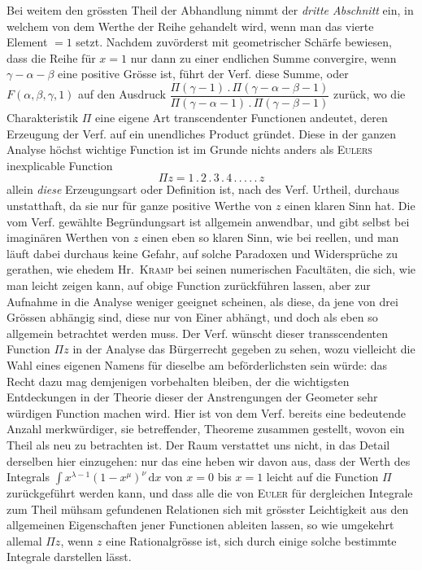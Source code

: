 Bei weitem den grössten Theil der Abhandlung nimmt der \textit{dritte Abschnitt} ein, in welchem von dem Werthe der Reihe gehandelt wird, wenn man das vierte Element $=1$ setzt. Nachdem zuvörderst mit geometrischer Schärfe bewiesen, dass die Reihe für $x=1$ nur dann zu einer endlichen Summe convergire, wenn $\gamma-\alpha-\beta$ eine positive Grösse ist, führt der Verf. diese Summe, oder $F(\alpha,\beta,\gamma,1)$ auf den Ausdruck $\dfrac{\Pi(\gamma-1)\,.\,\Pi(\gamma-\alpha-\beta-1)}{\Pi(\gamma-\alpha-1)\,.\,\Pi(\gamma-\beta-1)}$ zurück, wo die Charakteristik $\Pi$ eine eigene Art transcendenter Functionen andeutet, deren Erzeugung der Verf. auf ein unendliches Product gründet. Diese in der ganzen Analyse höchst wichtige Function ist im Grunde nichts anders als \textsc{Eulers} inexplicable Function
\[
\Pi z=1\,.\,2\,.\,3\,.\,4\,.\,.\,.\,.\,.\,z
\]
allein \textit{diese} Erzeugungsart oder Definition ist, nach des Verf. Urtheil, durchaus unstatthaft, da sie nur für ganze positive Werthe von $z$ einen klaren Sinn hat. Die vom Verf. gewählte Begründungsart ist allgemein anwendbar, und gibt selbst bei imaginären Werthen von $z$ einen eben so klaren Sinn, wie bei reellen, und man läuft dabei durchaus keine Gefahr, auf solche Paradoxen und Widersprüche zu gerathen, wie ehedem Hr.\ \textsc{Kramp} bei seinen numerischen Facultäten, die sich, wie man leicht zeigen kann, auf obige Function zurückführen lassen, aber zur Aufnahme in die Analyse weniger geeignet scheinen, als diese, da jene von drei Grössen abhängig sind, diese nur von Einer abhängt, und doch als eben so allgemein betrachtet werden muss. Der Verf. wünscht dieser transscendenten Function $\Pi z$ in der Analyse das Bürgerrecht gegeben zu sehen, wozu vielleicht die Wahl eines eigenen Namens für dieselbe am beförderlichsten sein würde: das Recht dazu mag demjenigen vorbehalten bleiben, der die wichtigsten Entdeckungen in der Theorie dieser der Anstrengungen der Geometer sehr würdigen Function machen wird. Hier ist von dem Verf. bereits eine bedeutende Anzahl merkwürdiger, sie betreffender, Theoreme zusammen gestellt, wovon ein Theil als neu zu betrachten ist. Der Raum verstattet uns nicht, in das Detail derselben hier einzugehen: nur das eine heben wir davon aus, dass der Werth des Integrals $\int x^{\lambda-1}(1-x^\mu)^\nu\,\mathrm{d}x$ von $x=0$ bis $x=1$ leicht auf die Function $\Pi$ zurückgeführt werden kann, und dass alle die von \textsc{Euler} für dergleichen Integrale zum Theil mühsam gefundenen Relationen sich mit grösster Leichtigkeit aus den allgemeinen Eigenschaften jener Functionen ableiten lassen, so wie umgekehrt allemal $\Pi z$, wenn $z$ eine Rationalgrösse ist, sich durch einige solche bestimmte Integrale darstellen lässt.

